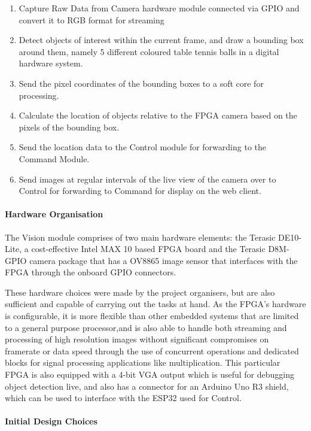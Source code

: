 \documentclass[a4paper]{article}
\begin{document}
\begin{enumerate}
    \item Capture Raw Data from Camera hardware module connected via GPIO and convert 
    it to RGB format for streaming
    \item Detect objects of interest within the current frame, and draw a bounding box around them, 
    namely 5 different coloured table tennis balls in a digital hardware system.
    \item Send the pixel coordinates of the bounding boxes to a soft core for processing.
    \item Calculate the location of objects relative to the FPGA camera based on the 
    pixels of the bounding box. 
    \item Send the location data to the Control module for forwarding to the Command Module. 
    \item Send images at regular intervals of the live view of the camera over to Control for
    forwarding to Command for display on the web client.
\end{enumerate}

\paragraph*{Hardware Organisation}

The Vision module comprises of two main hardware elements: 
    the Terasic DE10-Lite, a cost-effective Intel MAX 10 based FPGA board 
    \cite{TerasicDE10Web} 
    and the Terasic D8M-GPIO camera package that has a OV8865 image sensor \cite{TerasicD8MWeb}
that interfaces with the FPGA through the onboard GPIO connectors. 

These hardware choices were made by the project organisers, 
but are also sufficient and capable of carrying out the tasks at hand. 
As the FPGA's hardware is configurable, 
it is more flexible than other embedded systems 
that are limited to a general purpose processor,and 
is also able to handle both streaming and processing of high resolution images
without significant compromises on framerate or data speed 
through the use of concurrent operations and dedicated blocks 
for signal processing applications like multiplication.
This particular FPGA is also equipped with a 4-bit VGA output 
which is useful for debugging object detection live, 
and also has a connector for an Arduino Uno R3 shield, \cite{TerasicDE10Web} 
which can be used to interface with the ESP32 used for Control.  


\paragraph*{Initial Design Choices}
\end{document}
